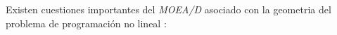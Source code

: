 \documentclass[letterpaper,10pt]{article}
\begin{document}
Existen cuestiones importantes del \emph{MOEA/D} asociado con la geometria del problema de programación no lineal \cite{4358754}:

%
%
%
%
%
\end{document}
